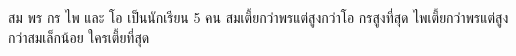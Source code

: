 ﻿%
\question สม พร กร ไพ และ โอ เป็นนักเรียน 5 คน สมเตี้ยกว่าพรแต่สูงกว่าโอ กรสูงที่สุด ไพเตี้ยกว่าพรแต่สูงกว่าสมเล็กน้อย \newline
ใครเตี้ยที่สุด
\newline
{}
